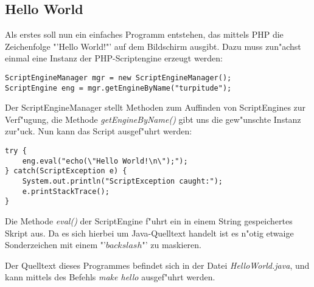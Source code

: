 \subsection{Hello World}
\label{sec:app1:hello}

Als erstes soll nun ein einfaches Programm entstehen, das mittels PHP die
Zeichenfolge "'Hello World!"' auf dem Bildschirm ausgibt. Dazu muss zun"achst
einmal eine Instanz der PHP-Scriptengine erzeugt werden:
\begin{lstlisting}[caption=Erzeugen der PHP-ScriptEngine]
ScriptEngineManager mgr = new ScriptEngineManager();
ScriptEngine eng = mgr.getEngineByName("turpitude");
\end{lstlisting}
Der ScriptEngineManager stellt Methoden zum Auffinden von ScriptEngines zur Verf"ugung,
die Methode \emph{getEngineByName()} gibt uns die gew"unschte Instanz zur"uck. Nun
kann das Script ausgef"uhrt werden:
\begin{lstlisting}[caption=Hello World Skript]
try {
    eng.eval("echo(\"Hello World!\n\");");
} catch(ScriptException e) {
    System.out.println("ScriptException caught:");
    e.printStackTrace();
}
\end{lstlisting}
Die Methode \emph{eval()} der ScriptEngine f"uhrt ein in einem String gespeichertes
Skript aus. Da es sich hierbei um Java-Quelltext handelt ist es n"otig etwaige Sonderzeichen
mit einem "'$backslash$"' zu maskieren.

Der Quelltext dieses Programmes befindet sich in der Datei \emph{HelloWorld.java}, und kann
mittels des Befehls \emph{make hello} ausgef"uhrt werden.

